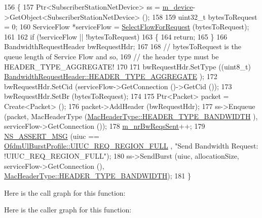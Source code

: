 \begin{DoxyCode}
156 \{
157   Ptr<SubscriberStationNetDevice> ss = \hyperlink{classns3_1_1BandwidthManager_a55eadfdb1964dad9875f14dfcf48eaed}{m\_device}->GetObject<SubscriberStationNetDevice> ();
158 
159   uint32\_t bytesToRequest = 0;
160   ServiceFlow *serviceFlow = \hyperlink{classns3_1_1BandwidthManager_a6ca1dc2064996be0c67fdd6697be9654}{SelectFlowForRequest} (bytesToRequest);
161 
162   \textcolor{keywordflow}{if} (!serviceFlow || !bytesToRequest)
163     \{
164       \textcolor{keywordflow}{return};
165     \}
166   BandwidthRequestHeader bwRequestHdr;
167 
168   \textcolor{comment}{// bytesToRequest is the queue length of Service Flow and so,}
169   \textcolor{comment}{// the header type must be HEADER\_TYPE\_AGGREGATE!}
170 
171   bwRequestHdr.SetType ((uint8\_t) \hyperlink{classns3_1_1BandwidthRequestHeader_abbaf4abd8f160828930369dff9a3d657ab6d7315b06d931e9c2db56f749a7d337}{BandwidthRequestHeader::HEADER\_TYPE\_AGGREGATE}
      );
172   bwRequestHdr.SetCid (serviceFlow->GetConnection ()->GetCid ());
173   bwRequestHdr.SetBr (bytesToRequest);
174 
175   Ptr<Packet> packet = Create<Packet> ();
176   packet->AddHeader (bwRequestHdr);
177   ss->Enqueue (packet, MacHeaderType (\hyperlink{classns3_1_1MacHeaderType_a54d8fc8bc93a2b7865627965cdd31c20a10501251f4c20ab02eb98217c4171e0e}{MacHeaderType::HEADER\_TYPE\_BANDWIDTH}
      ), serviceFlow->GetConnection ());
178   \hyperlink{classns3_1_1BandwidthManager_a18a831b18bb05ea6c9c48b77c3f1ac17}{m\_nrBwReqsSent}++;
179   \hyperlink{assert_8h_aff5ece9066c74e681e74999856f08539}{NS\_ASSERT\_MSG} (uiuc == \hyperlink{classns3_1_1OfdmUlBurstProfile_ae528783c4b3c6700ff49dfd7a555cb3daae074d10caa7fe18da973227c7f9942f}{OfdmUlBurstProfile::UIUC\_REQ\_REGION\_FULL}
      , \textcolor{stringliteral}{"Send Bandwidth Request: !UIUC\_REQ\_REGION\_FULL"});
180   ss->SendBurst (uiuc, allocationSize, serviceFlow->GetConnection (), 
      \hyperlink{classns3_1_1MacHeaderType_a54d8fc8bc93a2b7865627965cdd31c20a10501251f4c20ab02eb98217c4171e0e}{MacHeaderType::HEADER\_TYPE\_BANDWIDTH});
181 \}
\end{DoxyCode}


Here is the call graph for this function\+:




Here is the caller graph for this function\+:


